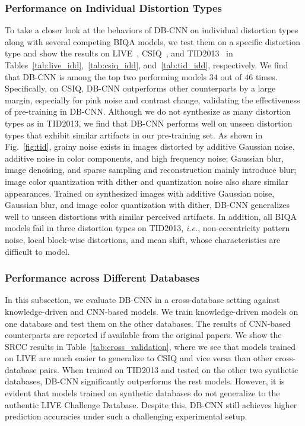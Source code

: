 \documentclass[journal]{IEEEtran}
\begin{document}
\subsubsection{Performance on Individual Distortion Types}\label{subsec:individual_distortions}
To take a closer look at the behaviors of DB-CNN on individual distortion types along with several competing BIQA models, we test them on a specific distortion type and show the results on LIVE~\cite{sheikh2006statistical}, CSIQ~\cite{larson2010most}, and TID2013~\cite{ponomarenko2013color} in Tables~\ref{tab:live_idd},~\ref{tab:csiq_idd}, and~\ref{tab:tid_idd}, respectively. We find that DB-CNN is among the top two performing models $34$  out of $46$ times. Specifically, on CSIQ, DB-CNN outperforms other counterparts by a large margin, especially for pink noise and contrast change, validating the effectiveness of pre-training in DB-CNN. Although we do not synthesize as many distortion types as in TID2013, we find that DB-CNN performs well on unseen distortion types that exhibit similar artifacts in our pre-training set. As shown in Fig.~\ref{fig:tid}, grainy noise exists in images distorted by additive Gaussian noise, additive noise in color components, and high frequency noise; Gaussian blur, image denoising, and sparse sampling and reconstruction mainly introduce blur; image color quantization with dither and quantization noise also share similar appearances. Trained on synthesized images with additive Gaussian noise, Gaussian blur, and image color quantization with dither, DB-CNN  generalizes well to unseen distortions with similar perceived artifacts. In addition, all BIQA models fail in three distortion types on TID2013, \textit{i.e.}, non-eccentricity pattern noise, local block-wise distortions, and mean shift, whose characteristics are difficult to model.




\subsubsection{Performance across Different Databases}\label{subsec:cross_database}
In this subsection, we evaluate DB-CNN in a cross-database setting against knowledge-driven and CNN-based models. We train knowledge-driven models on one database and test them on the other databases. The results of CNN-based counterparts are reported if available from the original papers.
We show the SRCC results in Table~\ref{tab:cross_validation}, where we see that models trained on LIVE are much easier to generalize to CSIQ and vice versa than other cross-database pairs. When trained on TID2013 and tested on the other two synthetic databases, DB-CNN significantly outperforms the rest  models. However, it is evident that models trained on synthetic databases do not generalize to the authentic LIVE Challenge Database. Despite this, DB-CNN still achieves higher prediction accuracies under such a challenging experimental setup.
\end{document}
